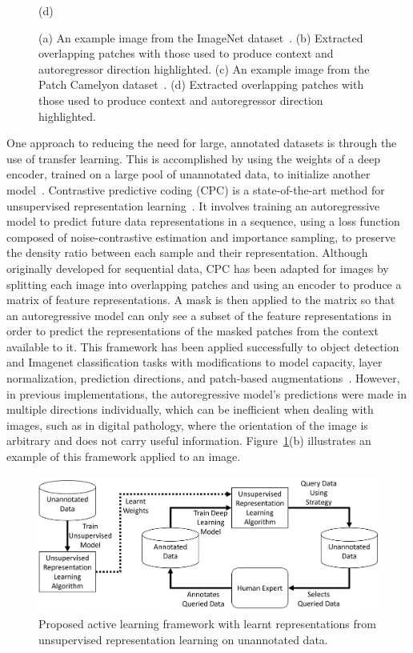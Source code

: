 \begin{figure}
\begin{minipage}[b]{.4\linewidth}
		\centerline{(d)}\medskip
	\end{minipage}
	\caption{(a) An example image from the ImageNet dataset~\citep{deng2009imagenet}. (b) Extracted overlapping patches with those used to produce context and autoregressor direction highlighted. (c) An example image from the Patch Camelyon dataset~\citep{veeling2018rotation}. (d) Extracted overlapping patches with those used to produce context and autoregressor direction highlighted.}
	\label{fig:example_cpc_patches}
\end{figure}

One approach to reducing the need for large, annotated datasets is through the use of transfer learning. This is accomplished by using the weights of a deep encoder, trained on a large pool of unannotated data, to initialize another model~\citep{weiss2016survey}. Contrastive predictive coding (CPC) is a state-of-the-art method for unsupervised representation learning~\citep{oord2018representation}. It involves training an autoregressive model to predict future data representations in a sequence, using a loss function composed of noise-contrastive estimation and importance sampling, to preserve the density ratio between each sample and their representation. Although originally developed for sequential data, CPC has been adapted for images by splitting each image into overlapping patches and using an encoder to produce a matrix of feature representations. A mask is then applied to the matrix so that an autoregressive model can only see a subset of the feature representations in order to predict the representations of the masked patches from the context available to it. This framework has been applied successfully to object detection and Imagenet classification tasks with modifications to model capacity, layer normalization, prediction directions, and patch-based augmentations~\citep{henaff2019data}. However, in previous implementations, the autoregressive model’s predictions were made in multiple directions individually, which can be inefficient when dealing with images, such as in digital pathology, where the orientation of the image is arbitrary and does not carry useful information. Figure~\ref{fig:example_cpc_patches}(b) illustrates an example of this framework applied to an image.

\begin{figure}[b]
	\centering
	\includegraphics[width=\textwidth]{images/active_unsupervised_learning.png}
	\caption{Proposed active learning framework with learnt representations from unsupervised representation learning on unannotated data.}
	\label{fig:active_unsupervised_learning_framework}
\end{figure}

